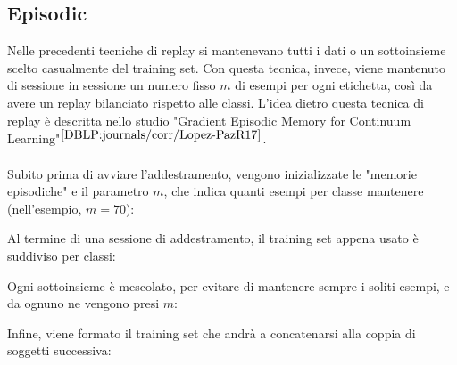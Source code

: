 \subsection{Episodic}  %
Nelle precedenti tecniche di replay si mantenevano tutti i dati o un sottoinsieme scelto casualmente del training set. Con questa tecnica, invece, viene mantenuto di sessione in sessione un numero fisso $m$ di esempi per ogni etichetta, così da avere un replay bilanciato rispetto alle classi. L'idea dietro questa tecnica di replay è descritta nello studio "Gradient Episodic Memory for Continuum Learning"$^{\cite{DBLP:journals/corr/Lopez-PazR17}}$.\\\\
Subito prima di avviare l'addestramento, vengono inizializzate le "memorie episodiche" e il parametro $m$, che indica quanti esempi per classe mantenere (nell'esempio, $m = 70$):

Al termine di una sessione di addestramento, il training set appena usato è suddiviso per classi:




Ogni sottoinsieme è mescolato, per evitare di mantenere sempre i soliti esempi, e da ognuno ne vengono presi $m$:




Infine, viene formato il training set che andrà a concatenarsi alla coppia di soggetti successiva:


